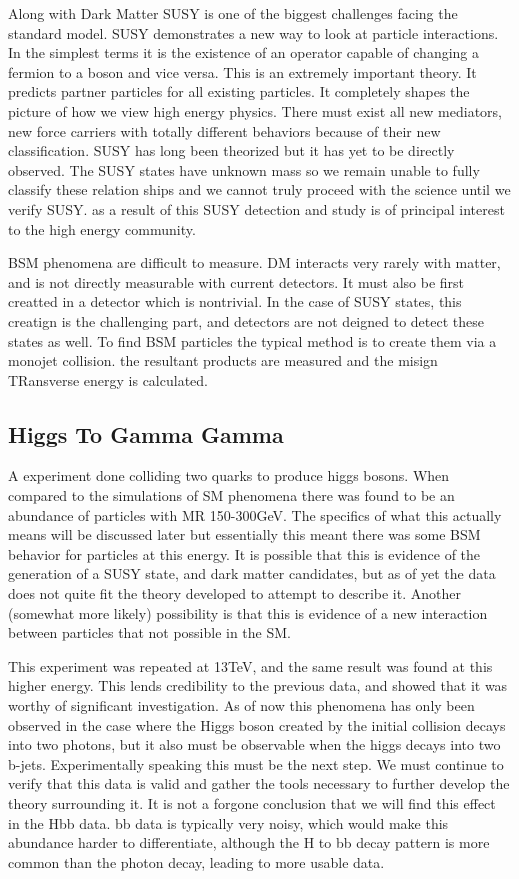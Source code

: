 \documentclass[twocolumn,aps,prd,reprint]{revtex4-1}
\begin{document}
Along with Dark Matter SUSY is one of the biggest challenges facing the standard model. SUSY demonstrates a new way to look at particle interactions. In the simplest terms it is the existence of an operator capable of changing a fermion to a boson and vice versa. This is an extremely important theory. It predicts partner particles for all existing particles. It completely shapes the picture of how we view high energy physics. There must exist all new mediators, new force carriers with totally different behaviors because of their new classification. SUSY has long been theorized but it has yet to be directly observed. The SUSY states have unknown mass so we remain unable to fully classify these relation ships and we cannot truly proceed with the science until we verify SUSY. as a result of this SUSY detection and study is of principal interest to the high energy community.

BSM phenomena are difficult to measure. DM interacts very rarely with matter, and is not directly measurable with current detectors. It must also be first creatted in a detector which is nontrivial. In the case of SUSY states, this creatign is the challenging part, and detectors are not deigned to detect these states as well. To find BSM particles the typical method is to create them via a monojet collision. the resultant products are measured and the misign TRansverse energy is calculated. 
\subsection{Higgs To Gamma Gamma}
 A experiment done colliding two quarks to produce higgs bosons. When compared to the simulations of SM phenomena there was found to be an abundance of particles with MR 150-300GeV. The specifics of what this actually means will be discussed later but essentially this meant there was some BSM behavior for particles at this energy. It is possible that this is evidence of the generation of a SUSY state, and dark matter candidates, but as of yet the data does not quite fit the theory developed to attempt to describe it. Another (somewhat more likely) possibility is that this is evidence of a new interaction between particles that not possible in the SM.

This experiment was repeated at 13TeV, and the same result was found at this higher energy. This lends credibility to the previous data, and showed that it was worthy of significant investigation. As of now this phenomena has only been observed in the case where the Higgs boson created by the initial collision decays into two photons, but it also must be observable when the higgs decays into two b-jets. Experimentally speaking this must be the next step. We must continue to verify that this data is valid and gather the tools necessary to further develop the theory surrounding it. It is not a forgone conclusion that we will find this effect in the Hbb data. bb data is typically very noisy, which would make this abundance harder to differentiate, although the H to bb decay pattern is more common than the photon decay, leading to more usable data. 
\end{document}
